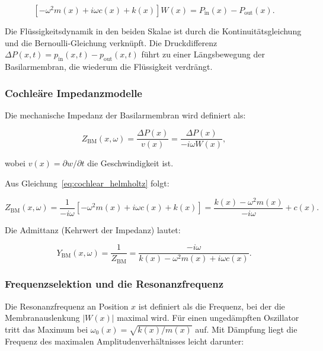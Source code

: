 ﻿\documentclass[12pt, a4paper]{article}
\theoremstyle{definition}
\theoremstyle{remark}
\begin{document}
\begin{equation}
\label{eq:cochlear_helmholtz}
\left[ -\omega^2 m(x) + i\omega c(x) + k(x) \right] W(x) 
= P_{\mathrm{in}}(x) - P_{\mathrm{out}}(x).
\end{equation}

Die Flüssigkeitsdynamik in den beiden Skalae ist durch die Kontinuitätsgleichung 
und die Bernoulli-Gleichung verknüpft. Die Druckdifferenz $\Delta P(x,t) = 
p_{\mathrm{in}}(x,t) - p_{\mathrm{out}}(x,t)$ führt zu einer Längsbewegung 
der Basilarmembran, die wiederum die Flüssigkeit verdrängt.

\subsubsection{Cochleäre Impedanzmodelle}

Die mechanische Impedanz der Basilarmembran wird definiert als:

\begin{equation}
\label{eq:basilar_impedance}
Z_{\mathrm{BM}}(x,\omega) = \frac{\Delta P(x)}{v(x)} 
= \frac{\Delta P(x)}{-i\omega W(x)},
\end{equation}

wobei $v(x) = \partial w/\partial t$ die Geschwindigkeit ist.

Aus Gleichung~\eqref{eq:cochlear_helmholtz} folgt:

\begin{equation}
\label{eq:impedance_explicit}
Z_{\mathrm{BM}}(x,\omega) 
= \frac{1}{-i\omega} \left[ -\omega^2 m(x) + i\omega c(x) + k(x) \right]
= \frac{k(x) - \omega^2 m(x)}{-i\omega} + c(x).
\end{equation}

Die Admittanz (Kehrwert der Impedanz) lautet:

\begin{equation}
\label{eq:basilar_admittance}
Y_{\mathrm{BM}}(x,\omega) = \frac{1}{Z_{\mathrm{BM}}} 
= \frac{-i\omega}{k(x) - \omega^2 m(x) + i\omega c(x)}.
\end{equation}

\subsubsection{Frequenzselektion und die Resonanzfrequenz}

Die Resonanzfrequenz an Position $x$ ist definiert als die Frequenz, bei der 
die Membranauslenkung $|W(x)|$ maximal wird. Für einen ungedämpften Oszillator 
tritt das Maximum bei $\omega_0(x) = \sqrt{k(x)/m(x)}$ auf. Mit Dämpfung liegt 
die Frequenz des maximalen Amplitudenverhältnisses leicht darunter:
\end{document}
